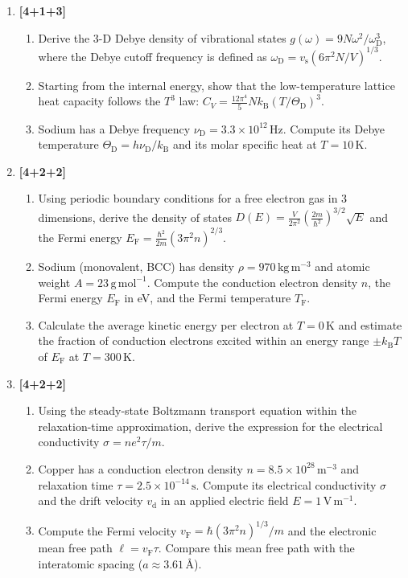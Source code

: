 \documentclass[11pt,a4paper]{article}
\newcommand{\kB}{k_{\mathrm{B}}}
\newcommand{\EF}{E_{\mathrm{F}}}
\newcommand{\TF}{T_{\mathrm{F}}}
\newcommand{\TD}{\Theta_{\mathrm{D}}}
\newcommand{\Cv}{C_{V}}
\begin{document}
\begin{enumerate}[leftmargin=*,itemsep=12pt,resume=questions]

\item \hfill\textbf{[4+1+3]}
\begin{enumerate}[label=(\alph*),itemsep=4pt]
    \item Derive the 3-D Debye density of vibrational states $g(\omega)=9N\omega^{2}/\omega_{\mathrm{D}}^{3}$, where the Debye cutoff frequency is defined as $\omega_{\mathrm{D}}=v_{\mathrm{s}}(6\pi^{2}N/V)^{1/3}$.
    \item Starting from the internal energy, show that the low-temperature lattice heat capacity follows the $T^3$ law: $\Cv=\tfrac{12\pi^{4}}{5}N\kB(T/\TD)^{3}$.
    \item Sodium has a Debye frequency $\nu_{\mathrm{D}}=3.3\times10^{12}\,\mathrm{Hz}$. Compute its Debye temperature $\TD=h\nu_{\mathrm{D}}/\kB$ and its molar specific heat at $T=10\,\mathrm{K}$.
\end{enumerate}

\item \hfill\textbf{[4+2+2]}
\begin{enumerate}[label=(\alph*),itemsep=4pt]
    \item Using periodic boundary conditions for a free electron gas in 3 dimensions, derive the density of states $D(E)=\tfrac{V}{2\pi^{2}}(\tfrac{2m}{\hbar^{2}})^{3/2}\sqrt{E}$ and the Fermi energy $\EF=\tfrac{\hbar^{2}}{2m}(3\pi^{2}n)^{2/3}$.
    \item Sodium (monovalent, BCC) has density $\rho=970\,\mathrm{kg\,m^{-3}}$ and atomic weight $A=23\,\mathrm{g\,mol^{-1}}$. Compute the conduction electron density $n$, the Fermi energy $\EF$ in eV, and the Fermi temperature $\TF$.
    \item Calculate the average kinetic energy per electron at $T=0\,\mathrm{K}$ and estimate the fraction of conduction electrons excited within an energy range $\pm\kB T$ of $\EF$ at $T=300\,\mathrm{K}$.
\end{enumerate}

\item \hfill\textbf{[4+2+2]}
\begin{enumerate}[label=(\alph*),itemsep=4pt]
    \item Using the steady-state Boltzmann transport equation within the relaxation-time approximation, derive the expression for the electrical conductivity $\sigma=ne^{2}\tau/m$.
    \item Copper has a conduction electron density $n=8.5\times10^{28}\,\mathrm{m^{-3}}$ and relaxation time $\tau=2.5\times10^{-14}\,\mathrm{s}$. Compute its electrical conductivity $\sigma$ and the drift velocity $v_{\mathrm{d}}$ in an applied electric field $E=1\,\mathrm{V\,m^{-1}}$.
    \item Compute the Fermi velocity $v_{\mathrm{F}}=\hbar(3\pi^{2}n)^{1/3}/m$ and the electronic mean free path $\ell=v_{\mathrm{F}}\tau$. Compare this mean free path with the interatomic spacing ($a \approx 3.61\,\text{\AA}$).
\end{enumerate}

\end{enumerate}
\end{document}
